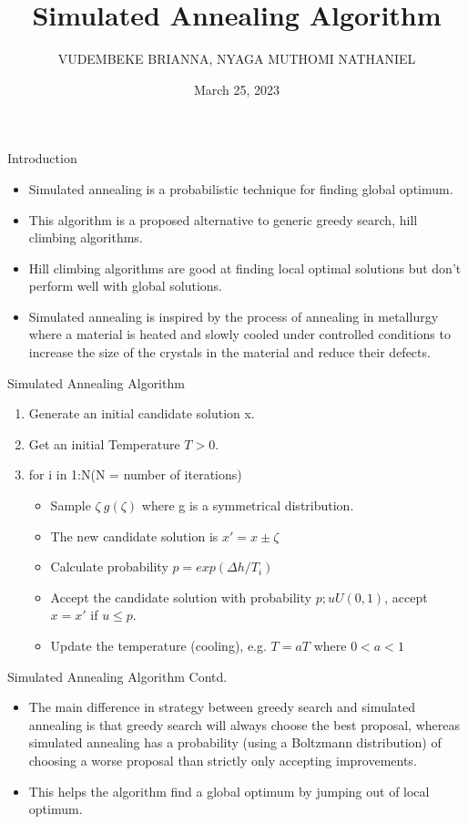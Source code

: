 \documentclass{beamer}
\title{Simulated Annealing Algorithm}
\author{VUDEMBEKE BRIANNA, NYAGA MUTHOMI NATHANIEL}
\date{March 25, 2023}
\begin{document}
\begin{frame}
\titlepage
\end{frame}

\begin{frame}{Introduction}
\begin{itemize}
\item Simulated annealing is a probabilistic technique for finding global optimum.
\item This algorithm is a proposed alternative to generic greedy search, hill climbing algorithms.
\item Hill climbing algorithms are good at finding local optimal solutions but don't perform well with global solutions.
\item Simulated annealing is inspired by the process of annealing in metallurgy where a material is heated and slowly cooled under controlled conditions to increase the size of the crystals in the material and reduce their defects.
\end{itemize}
\end{frame}

\begin{frame}{Simulated Annealing Algorithm}
\begin{enumerate}
\item Generate an initial candidate solution x.
\item Get an initial Temperature $ T > 0$.
\item for i in 1:N(N = number of iterations)
\begin{itemize}
\item Sample $ \zeta ~ g(\zeta)$ where g is a symmetrical distribution.
\item The new candidate solution is $x' = x ± \zeta$
\item Calculate probability $p=exp(\Delta h/T_{i})$
\item Accept the candidate solution with probability $p; u U(0, 1)$, accept $x = x'$ if $u \leq p.$
\item Update the temperature (cooling), e.g. $T = aT$ where $0 < a < 1$
\end{itemize}
\end{enumerate}
\end{frame}

\begin{frame}{Simulated Annealing Algorithm Contd.}
\begin{itemize}
\item The main difference in strategy between greedy search and simulated annealing is that greedy search will always choose the best proposal, whereas simulated annealing has a probability (using a Boltzmann distribution) of choosing a worse proposal than strictly only accepting improvements.
\item This helps the algorithm find a global optimum by jumping out of local optimum.
\end{itemize}
\end{frame}
\end{document}
